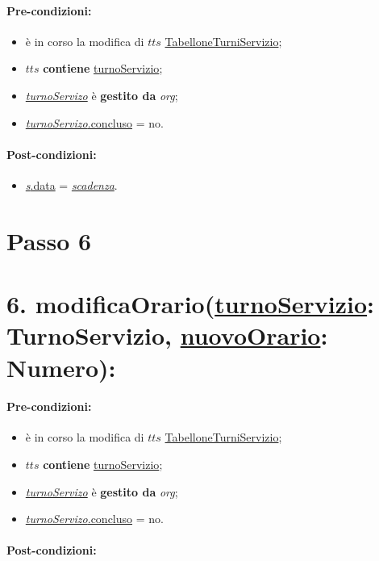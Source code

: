 \paragraph{Pre-condizioni:}
\begin{itemize}
\item è in corso la modifica di $tts$ \underline{TabelloneTurniServizio};
 \item $tts$ \textbf{contiene} \underline{turnoServizio};
 \item \underline{\textit{turnoServizo}} è \textbf{gestito da} {\textit{org}};
 \item \underline{\textit{turnoServizo}.concluso} = no.
\end{itemize}

\paragraph{Post-condizioni:}
\begin{itemize}
    \item \underline{\textit{s}.data} = \underline{\textit{scadenza}}.
\end{itemize}

\section{Passo 6}
\section*{6. modificaOrario(\underline{turnoServizio}: TurnoServizio, \underline{nuovoOrario}: Numero):}

\paragraph{Pre-condizioni:}
\begin{itemize}
 \item è in corso la modifica di $tts$ \underline{TabelloneTurniServizio};
 \item $tts$ \textbf{contiene} \underline{turnoServizio};
   \item \underline{\textit{turnoServizo}} è \textbf{gestito da} {\textit{org}};
   \item \underline{\textit{turnoServizo}.concluso} = no.
\end{itemize}

\paragraph{Post-condizioni:}

